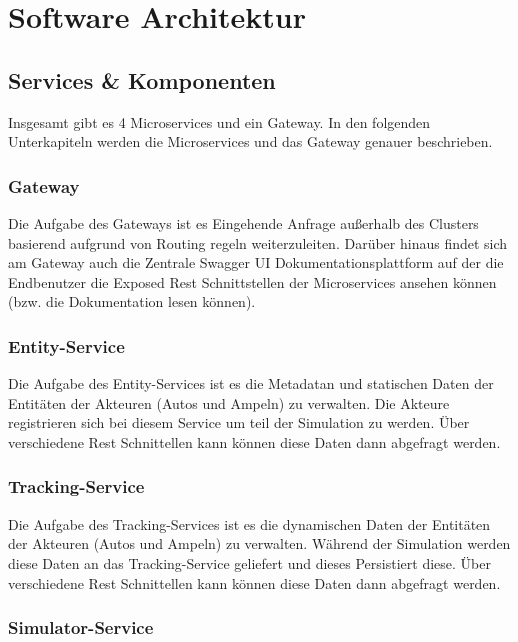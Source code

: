 \section{Software Architektur}

\subsection{Services \& Komponenten}

Insgesamt gibt es 4 Microservices und ein Gateway. In den folgenden Unterkapiteln werden die Microservices  und das Gateway genauer beschrieben.

\subsubsection{Gateway}

Die Aufgabe des Gateways ist es Eingehende Anfrage außerhalb des Clusters basierend aufgrund von Routing regeln weiterzuleiten. Darüber hinaus findet sich am Gateway auch die Zentrale Swagger UI Dokumentationsplattform auf der die Endbenutzer die Exposed Rest Schnittstellen der Microservices ansehen können (bzw. die Dokumentation lesen können).

\subsubsection{Entity-Service}

Die Aufgabe des Entity-Services ist es die Metadatan und statischen Daten der Entitäten der Akteuren (Autos und Ampeln) zu verwalten. Die Akteure registrieren sich bei diesem Service um teil der Simulation zu werden. Über verschiedene Rest Schnittellen kann können diese Daten dann abgefragt werden.

\subsubsection{Tracking-Service}

Die Aufgabe des Tracking-Services ist es die dynamischen Daten der Entitäten der Akteuren (Autos und Ampeln) zu verwalten. Während der Simulation werden diese Daten an das Tracking-Service geliefert und dieses Persistiert diese. Über verschiedene Rest Schnittellen kann können diese Daten dann abgefragt werden.

\subsubsection{Simulator-Service}

